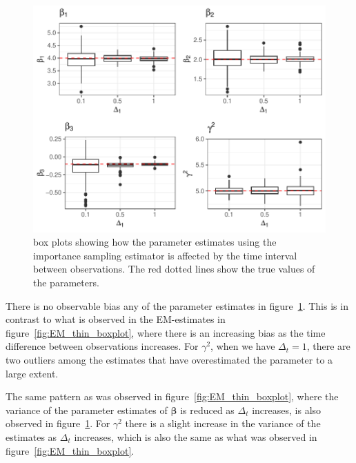 \begin{figure}[H]
    \centering
    \includegraphics[width=\linewidth]{Images/Results/varying dt plot brownian bridge likelihood.pdf}
    \caption[Box plots of Parameter Estimates using Brownian bridge importance sampling at different sampling intervals]{box plots showing how the parameter estimates using the importance sampling estimator is affected by the time interval between observations. The red dotted lines show the true values of the parameters.}
    \label{fig:varying dt boxplot BB}
\end{figure}

There is no observable bias any of the parameter estimates in figure~\ref{fig:varying dt boxplot BB}. This is in contrast to what is observed in the EM-estimates in figure~\ref{fig:EM_thin_boxplot}, where there is an increasing bias as the time difference between observations increases. For $\gamma^2$, when we have $\Delta_t=1$, there are two outliers among the estimates that have overestimated the parameter to a large extent. 

The same pattern as was observed in figure~\ref{fig:EM_thin_boxplot}, where the variance of the parameter estimates of $\bm \beta$ is reduced as $\Delta_t$ increases, is also observed in figure~\ref{fig:varying dt boxplot BB}. For $\gamma^2$ there is a slight increase in the variance of the estimates as $\Delta_t$ increases, which is also the same as what was observed in figure~\ref{fig:EM_thin_boxplot}.



